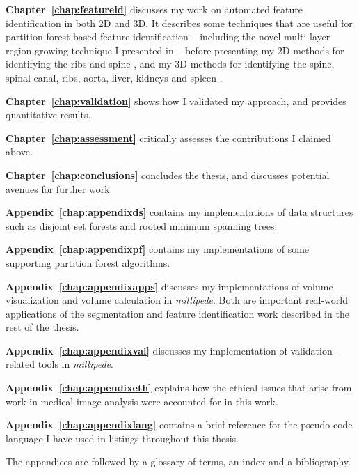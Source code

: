 \textbf{Chapter~\ref{chap:featureid}} discusses my work on automated feature identification in both 2D and 3D. It describes some techniques that are useful for partition forest-based feature identification -- including the novel multi-layer region growing technique I presented in \cite{gvcispa09} -- before presenting my 2D methods for identifying the ribs \cite{gvccimi08} and spine \cite{gvcispa09}, and my 3D methods for identifying the spine, spinal canal, ribs, aorta, liver, kidneys and spleen \cite{gvcoucl10}.

\textbf{Chapter~\ref{chap:validation}} shows how I validated my approach, and provides quantitative results.

\textbf{Chapter~\ref{chap:assessment}} critically assesses the contributions I claimed above.

\textbf{Chapter~\ref{chap:conclusions}} concludes the thesis, and discusses potential avenues for further work.

\textbf{Appendix~\ref{chap:appendixds}} contains my implementations of data structures such as disjoint set forests and rooted minimum spanning trees.

\textbf{Appendix~\ref{chap:appendixpf}} contains my implementations of some supporting partition forest algorithms.

\textbf{Appendix~\ref{chap:appendixapps}} discusses my implementations of volume visualization and volume calculation in \emph{millipede}. Both are important real-world applications of the segmentation and feature identification work described in the rest of the thesis.

\textbf{Appendix~\ref{chap:appendixval}} discusses my implementation of validation-related tools in \emph{millipede}.

\textbf{Appendix~\ref{chap:appendixeth}} explains how the ethical issues that arise from work in medical image analysis were accounted for in this work.

\textbf{Appendix~\ref{chap:appendixlang}} contains a brief reference for the pseudo-code language I have used in listings throughout this thesis.

The appendices are followed by a glossary of terms, an index and a bibliography.
